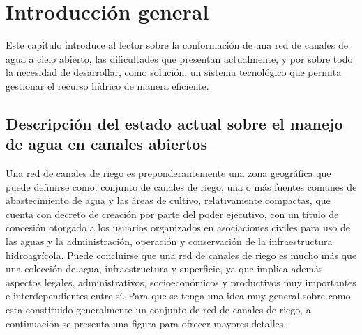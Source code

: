
\chapter{Introducción general} %

\label{Chapter1} %
\label{IntroGeneral}

Este capítulo introduce al lector sobre la conformación de una red de canales de agua a cielo abierto, las dificultades que presentan actualmente, y por sobre todo la necesidad de desarrollar, como solución, un sistema tecnológico que permita gestionar el recurso hídrico de manera eficiente. 

\newcommand{\keyword}[1]{\textbf{#1}}
\newcommand{\tabhead}[1]{\textbf{#1}}
\newcommand{\code}[1]{\texttt{#1}}
\newcommand{\file}[1]{\texttt{\bfseries#1}}
\newcommand{\option}[1]{\texttt{\itshape#1}}
\newcommand{\grados}{$^{\circ}$}



\section{Descripción del estado actual sobre el manejo de agua en canales abiertos}

Una red de canales de riego es preponderantemente una zona geográfica que puede definirse como: conjunto de canales de riego, una o más fuentes comunes de abastecimiento de agua y las áreas de cultivo, relativamente compactas, que cuenta con decreto de creación por parte del poder ejecutivo, con un título de concesión otorgado a los usuarios organizados en asociaciones civiles para uso de las aguas y la administración, operación y conservación de la infraestructura hidroagrícola.
Puede concluirse que una red de canales de riego es mucho más que una colección de agua, infraestructura y
superficie, ya que implica además aspectos legales, administrativos, socioeconómicos y productivos muy importantes e interdependientes entre sí.
Para que se tenga una idea muy general sobre como esta constituido generalmente un conjunto de red de canales de riego, a continuación se presenta una figura para ofrecer mayores detalles.

